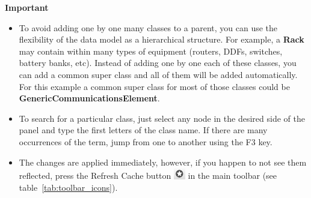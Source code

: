 \documentclass[a4paper]{article}
\begin{document}
	\begin{framed} {\large \textbf{Important}}
		\begin{itemize}
			\item To avoid adding one by one many classes to a parent, you can use the flexibility of the data model as a hierarchical structure. For example, a \textbf{Rack} may contain within many types of equipment (routers, DDFs, switches, battery banks, etc). Instead of adding one by one each of these classes, you can add a common super class and all of them will be added automatically. For this example a common super class for most of those classes could be \textbf{GenericCommunicationsElement}.
			\item To search for a particular class, just select any node in the desired side of the panel and type the first letters of the class name. If there are many occurrences of the term, jump from one to another using the F3 key.
			\item The changes are applied immediately, however, if you happen to not see them reflected, press the Refresh Cache button \includegraphics[width=0.5cm]{img/icon_refresh_cache.png} in the main toolbar (see table~\ref{tab:toolbar_icons}).
		\end{itemize}
	\end{framed}
	\newpage
	
	\newpage
\end{document}
